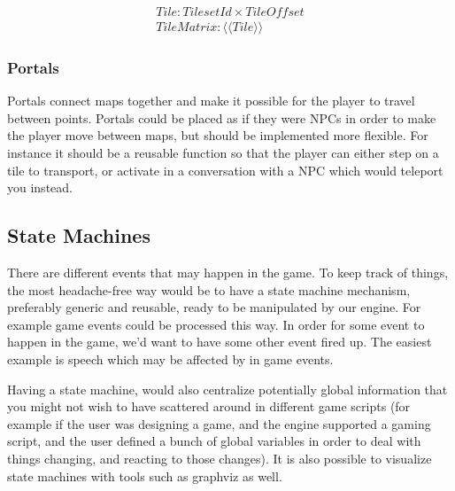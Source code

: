 \begin{equation}
\begin{split}
Tile\colon TilesetId \times TileOffset \\
TileMatrix\colon \langle \langle Tile \rangle \rangle
\end{split}
\end{equation}

\subsubsection{Portals}

Portals connect maps together and make it possible for the player to travel
between points. Portals could be placed as if they were NPCs in order to make
the player move between maps, but should be implemented more flexible. For
instance it should be a reusable function so that the player can either step
on a tile to transport, or activate in a conversation with a NPC which would
teleport you instead.

\subsection{State Machines}

There are different events that may happen in the game. To keep track of
things, the most headache-free way would be to have a state machine mechanism,
preferably generic and reusable, ready to be manipulated by our engine. For
example game events could be processed this way. In order for some event to
happen in the game, we'd want to have some other event fired up. The easiest
example is speech which may be affected by in game events.

Having a state machine, would also centralize potentially global information
that you might not wish to have scattered around in different game scripts (for
example if the user was designing a game, and the engine supported a gaming
script, and the user defined a bunch of global variables in order to deal with
things changing, and reacting to those changes). It is also possible to visualize
state machines with tools such as graphviz as well.
